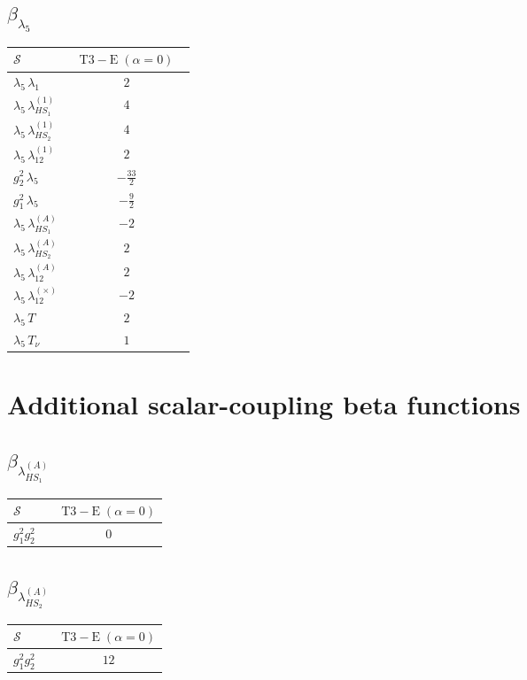 \documentclass[9pt]{article}
\begin{document}
\subsection*{$ \beta_{\lambda_5} $}
\begin{longtable}{@{}p{0.31\linewidth}c@{}}
\toprule
$\mathcal{S}$ & $ \mathrm{T3-E}\;(\alpha=0) $ \\
\midrule
$ \lambda_5\,\lambda_1 $ & $ 2 $ \\
$ \lambda_5\,\lambda_{HS_1}^{(1)} $ & $ 4 $ \\
$ \lambda_5\,\lambda_{HS_2}^{(1)} $ & $ 4 $ \\
$ \lambda_5\,\lambda_{12}^{(1)} $ & $ 2 $ \\
$ g_2^2\,\lambda_5 $ & $ - \frac{33}{2} $ \\
$ g_1^2\,\lambda_5 $ & $ - \frac{9}{2} $ \\
$ \lambda_5\,\lambda_{HS_1}^{(A)} $ & $ -2 $ \\
$ \lambda_5\,\lambda_{HS_2}^{(A)} $ & $ 2 $ \\
$ \lambda_5\,\lambda_{12}^{(A)} $ & $ 2 $ \\
$ \lambda_5\,\lambda_{12}^{(\times)} $ & $ -2 $ \\
$ \lambda_5\,T $ & $ 2 $ \\
$ \lambda_5\,T_\nu $ & $ 1 $ \\
\bottomrule
\end{longtable}
\section*{Additional scalar-coupling beta functions}
\subsection*{$ \beta_{\lambda_{HS_1}^{(A)}} $}
\begin{longtable}{@{}p{0.31\linewidth}c@{}}
\toprule
$\mathcal{S}$ & $ \mathrm{T3-E}\;(\alpha=0) $ \\
\midrule
$ g_1^2g_2^2 $ & $ 0 $ \\
\bottomrule
\end{longtable}
\subsection*{$ \beta_{\lambda_{HS_2}^{(A)}} $}
\begin{longtable}{@{}p{0.31\linewidth}c@{}}
\toprule
$\mathcal{S}$ & $ \mathrm{T3-E}\;(\alpha=0) $ \\
\midrule
$ g_1^2g_2^2 $ & $ 12 $ \\
\bottomrule
\end{longtable}
\end{document}
